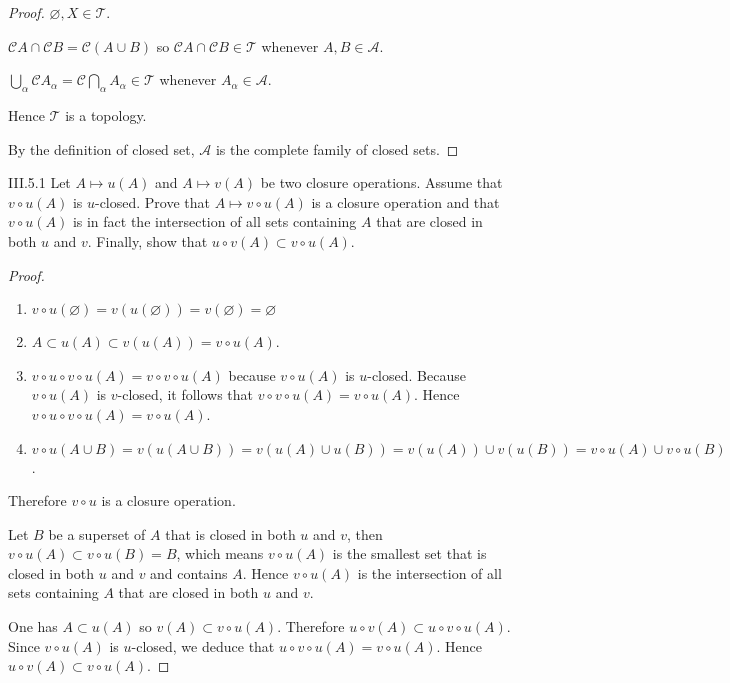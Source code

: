 \begin{proof}
	\( \varnothing, X \in \mathscr{T} \).

	\( \mathscr{C}A \cap \mathscr{C}B = \mathscr{C}(A \cup B) \) so \( \mathscr{C}A \cap \mathscr{C}B \in \mathscr{T} \) whenever \( A, B \in \mathscr{A} \).

	\( \bigcup_{\alpha} \mathscr{C}A_{\alpha} = \mathscr{C}\bigcap_{\alpha}A_{\alpha} \in \mathscr{T} \) whenever \( A_{\alpha} \in \mathscr{A} \).

	Hence \( \mathscr{T} \) is a topology.

	By the definition of closed set, \( \mathscr{A} \) is the complete family of closed sets.
\end{proof}

\begin{problem}{III.5.1}
Let \(A \mapsto u(A)\) and \(A \mapsto v(A)\) be two closure operations. Assume that \( v\circ u(A) \) is \(u\)-closed. Prove that \( A \mapsto v\circ u(A) \) is a closure operation and that \(v\circ u(A)\) is in fact the intersection of all sets containing \(A\) that are closed in both \(u\) and \(v\). Finally, show that \(u\circ v(A) \subset v\circ u(A)\).
\end{problem}

\begin{proof}
	\begin{enumerate}[label={(\arabic*)}]
		\item \( v\circ u(\varnothing) = v(u(\varnothing)) = v(\varnothing) = \varnothing \)
		\item \( A \subset u(A) \subset v(u(A)) = v\circ u(A) \).
		\item \( v\circ u \circ v\circ u(A) = v\circ v\circ u(A) \) because \( v\circ u(A) \) is \(u\)-closed. Because \( v\circ u(A) \) is \(v\)-closed, it follows that \( v\circ v\circ u(A) = v\circ u(A) \). Hence \( v\circ u \circ v\circ u(A) = v\circ u(A) \).
		\item \( v\circ u(A \cup B) = v(u(A \cup B)) = v(u(A) \cup u(B)) = v(u(A)) \cup v(u(B)) = v\circ u(A) \cup v\circ u(B) \).
	\end{enumerate}

	Therefore \( v\circ u \) is a closure operation.

	Let \(B\) be a superset of \(A\) that is closed in both \(u\) and \(v\), then \( v\circ u(A) \subset v\circ u(B) = B \), which means \( v\circ u(A) \) is the smallest set that is closed in both \(u\) and \(v\) and contains \(A\). Hence \( v\circ u(A) \) is the intersection of all sets containing \(A\) that are closed in both \(u\) and \(v\).

	One has \( A \subset u(A) \) so \( v(A) \subset v\circ u(A) \). Therefore \( u \circ v(A) \subset u\circ v\circ u(A) \). Since \( v\circ u(A) \) is \(u\)-closed, we deduce that \( u\circ v\circ u(A) = v\circ u(A) \). Hence \( u\circ v(A) \subset v\circ u(A) \).
\end{proof}

